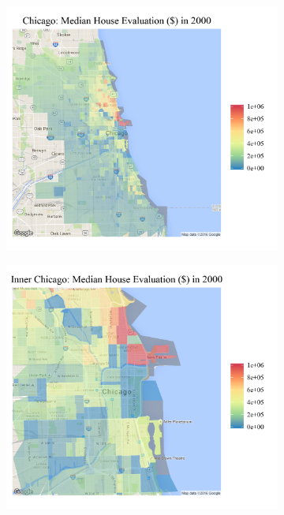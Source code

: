 {\begin{figure}[h!]
\centering
\begin{subfigure}{.45\textwidth}
  \centering
\includegraphics[scale=.15]{figures/c_2000.png}
\end{subfigure}%
\begin{subfigure}{.45\textwidth}
  \centering
\includegraphics[scale=.15]{figures/c_2000_inner.png}

\end{subfigure}
\end{figure}}
